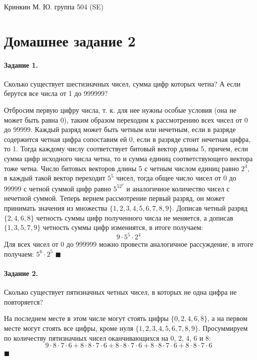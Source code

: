 \documentclass[a4paper,12pt]{article}
\begin{document}
\sloppy

\lstset{
	basicstyle=\small,
	stringstyle=\ttfamily,
	showstringspaces=false,
	columns=fixed,
	breaklines=true,
	numbers=right,
	numberstyle=\tiny
}

\newtheorem{Def}{Определение}[section]
\newtheorem{Th}{Теорема}
\newtheorem{Lem}[Th]{Лемма}
\newenvironment{Proof}
	{\par\noindent{\bf Доказательство.}}
	{\hfill$\scriptstyle\blacksquare$}
\newenvironment{Solution}
	{\par\noindent{\bf Решение.}}
	{\hfill$\scriptstyle\blacksquare$}


\begin{flushright}
	Кринкин М. Ю. группа 504 (SE)
\end{flushright}

\section{Домашнее задание 2}
\paragraph{Задание 1.} Сколько существует шестизначных чисел, сумма цифр которых четна? А если берутся все числа от 1 до 999999?
\begin{Solution}
Отбросим первую цифру числа, т. к. для нее нужны особые условия (она не может быть равна 0), таким образом переходим к рассмотрению всех чисел от 0 до 99999. Каждый разряд может быть четным или нечетным, если в разряде содержится четная цифра сопоставим ей 0, если в разряде стоит нечетная цифра, то 1. Тогда каждому числу соответствует битовый вектор длины 5, причем, если сумма цифр исходного числа четна, то и сумма единиц соответствующего вектора тоже четна. Число битовых векторов длины 5 с четным числом единиц равно $2^4$, в каждый такой вектор переходит $5^5$ чисел, тогда общее число чисел от 0 до 99999 с четной суммой цифр равно $5^52^4$ и аналогичное количество чисел с нечетной суммой. Теперь вернем  рассмотрение первый разряд, он может принимать значения из множества $\{1, 2, 3, 4, 5, 6, 7, 8, 9\}$. Дописав четный разряд $\{2, 4, 6, 8\}$ четность суммы цифр полученного числа не меняется, а дописав $\{1, 3, 5, 7, 9\}$ четность суммы цифр измениятся, в итоге получаем:
\[
	9 \cdot 5^5 \cdot 2^4
\]
Для всех чисел от 0 до 999999 можно провести аналогичное рассуждение, в итоге получаем: $5^6 \cdot 2^5$
\end{Solution}
\paragraph{Задание 2.} Сколько существует пятизначных четных чисел, в которых не одна цифра не повторяется?
\begin{Solution}
На последнем месте в этом числе могут стоять цифры $\{0, 2, 4, 6, 8\}$, а на первом месте могут стоять все цифры, кроме нуля $\{1, 2, 3, 4, 5, 6, 7, 8, 9\}$. Просуммируем по количеству пятизначных чисел оканчивающихся на 0, 2, 4, 6 и 8:
\[
	9 \cdot 8 \cdot 7 \cdot 6 + 8 \cdot 8 \cdot 7 \cdot 6 + 8 \cdot 8 \cdot 7 \cdot 6 + 8 \cdot 8 \cdot 7 \cdot 6 + 8 \cdot 8 \cdot 7 \cdot 6
\]
\end{Solution}
\end{document}
